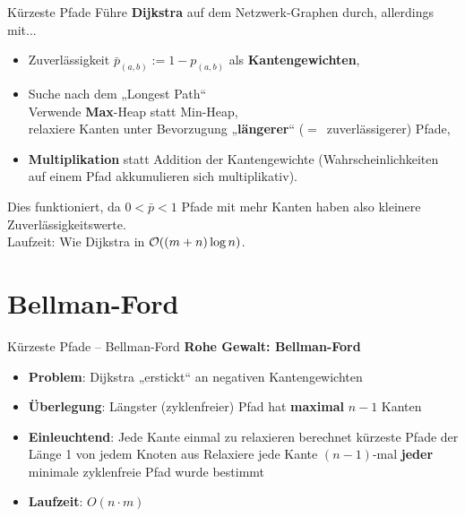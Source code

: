\begin{frame}{Kürzeste Pfade}
	\solutionheading
	Führe \textbf{Dijkstra} auf dem Netzwerk-Graphen durch, allerdings mit...
	\begin{itemize}
		\item Zuverlässigkeit $\bar{p}_{(a,b)} := 1 - p_{(a,b)}$ als \textbf{Kantengewichten},
		\item Suche nach dem „Longest Path“ \\
		\impl Verwende \textbf{Max}-Heap statt Min-Heap, \\
		\impl relaxiere Kanten unter Bevorzugung „\textbf{längerer}“ {\small ($=$~zuverlässigerer)} Pfade,
		\item \textbf{Multiplikation} statt Addition der Kantengewichte (Wahrscheinlichkeiten auf einem Pfad akkumulieren sich multiplikativ).
	\end{itemize}
	\pause
	Dies funktioniert, da $ 0 < \bar{p} < 1$ \impl Pfade mit mehr Kanten haben also kleinere Zuverlässigkeitswerte. \\
	\pause
	\smallskip
	Laufzeit: Wie Dijkstra in $\mathcal{O}\!\left((m+n) \log n\right)$.
\end{frame}

\section{Bellman-Ford}

\begin{frame}{Kürzeste Pfade – Bellman-Ford}
	\textbf{Rohe Gewalt: Bellman-Ford} 
	\begin{itemize}
		\item \textbf{Problem}: Dijkstra „erstickt“ an negativen Kantengewichten
		\pause
		\item \textbf{Überlegung}: Längster (zyklenfreier) Pfad hat \textbf{maximal} $n-1$ Kanten
		\item \textbf{Einleuchtend}: Jede Kante einmal zu relaxieren berechnet kürzeste Pfade der Länge 1 von jedem Knoten aus
		\pause
		\implitem Relaxiere jede Kante $(n-1)$-mal \impl \textbf{jeder} minimale zyklenfreie Pfad wurde bestimmt
		\pause
		\item \textbf{Laufzeit}: $O(n \cdot m)$
	\end{itemize}
\end{frame}

